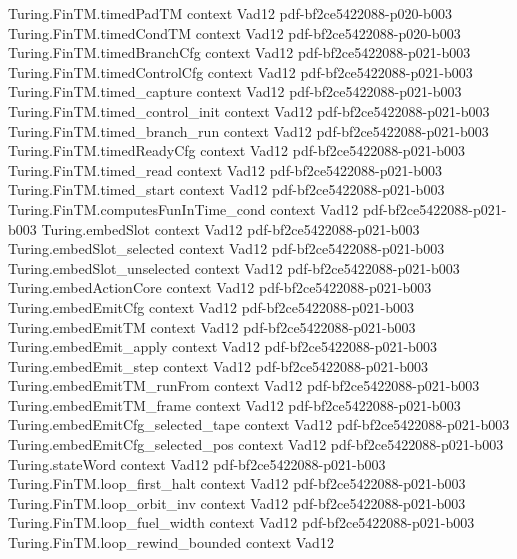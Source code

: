 \begin{theorem}
  {Turing.FinTM.timedPadTM}
  {context}
  {Vad12}
  {pdf-bf2ce5422088-p020-b003}
\proofstep
  {Turing.FinTM.timedCondTM}
  {context}
  {Vad12}
  {pdf-bf2ce5422088-p020-b003}
\proofstep
  {Turing.FinTM.timedBranchCfg}
  {context}
  {Vad12}
  {pdf-bf2ce5422088-p021-b003}
\proofstep
  {Turing.FinTM.timedControlCfg}
  {context}
  {Vad12}
  {pdf-bf2ce5422088-p021-b003}
\proofstep
  {Turing.FinTM.timed_capture}
  {context}
  {Vad12}
  {pdf-bf2ce5422088-p021-b003}
\proofstep
  {Turing.FinTM.timed_control_init}
  {context}
  {Vad12}
  {pdf-bf2ce5422088-p021-b003}
\proofstep
  {Turing.FinTM.timed_branch_run}
  {context}
  {Vad12}
  {pdf-bf2ce5422088-p021-b003}
\proofstep
  {Turing.FinTM.timedReadyCfg}
  {context}
  {Vad12}
  {pdf-bf2ce5422088-p021-b003}
\proofstep
  {Turing.FinTM.timed_read}
  {context}
  {Vad12}
  {pdf-bf2ce5422088-p021-b003}
\proofstep
  {Turing.FinTM.timed_start}
  {context}
  {Vad12}
  {pdf-bf2ce5422088-p021-b003}
\proofstep
  {Turing.FinTM.computesFunInTime_cond}
  {context}
  {Vad12}
  {pdf-bf2ce5422088-p021-b003}
\proofstep
  {Turing.embedSlot}
  {context}
  {Vad12}
  {pdf-bf2ce5422088-p021-b003}
\proofstep
  {Turing.embedSlot_selected}
  {context}
  {Vad12}
  {pdf-bf2ce5422088-p021-b003}
\proofstep
  {Turing.embedSlot_unselected}
  {context}
  {Vad12}
  {pdf-bf2ce5422088-p021-b003}
\proofstep
  {Turing.embedActionCore}
  {context}
  {Vad12}
  {pdf-bf2ce5422088-p021-b003}
\proofstep
  {Turing.embedEmitCfg}
  {context}
  {Vad12}
  {pdf-bf2ce5422088-p021-b003}
\proofstep
  {Turing.embedEmitTM}
  {context}
  {Vad12}
  {pdf-bf2ce5422088-p021-b003}
\proofstep
  {Turing.embedEmit_apply}
  {context}
  {Vad12}
  {pdf-bf2ce5422088-p021-b003}
\proofstep
  {Turing.embedEmit_step}
  {context}
  {Vad12}
  {pdf-bf2ce5422088-p021-b003}
\proofstep
  {Turing.embedEmitTM_runFrom}
  {context}
  {Vad12}
  {pdf-bf2ce5422088-p021-b003}
\proofstep
  {Turing.embedEmitTM_frame}
  {context}
  {Vad12}
  {pdf-bf2ce5422088-p021-b003}
\proofstep
  {Turing.embedEmitCfg_selected_tape}
  {context}
  {Vad12}
  {pdf-bf2ce5422088-p021-b003}
\proofstep
  {Turing.embedEmitCfg_selected_pos}
  {context}
  {Vad12}
  {pdf-bf2ce5422088-p021-b003}
\proofstep
  {Turing.stateWord}
  {context}
  {Vad12}
  {pdf-bf2ce5422088-p021-b003}
\proofstep
  {Turing.FinTM.loop_first_halt}
  {context}
  {Vad12}
  {pdf-bf2ce5422088-p021-b003}
\proofstep
  {Turing.FinTM.loop_orbit_inv}
  {context}
  {Vad12}
  {pdf-bf2ce5422088-p021-b003}
\proofstep
  {Turing.FinTM.loop_fuel_width}
  {context}
  {Vad12}
  {pdf-bf2ce5422088-p021-b003}
\proofstep
  {Turing.FinTM.loop_rewind_bounded}
  {context}
  {Vad12}

\end{theorem}
